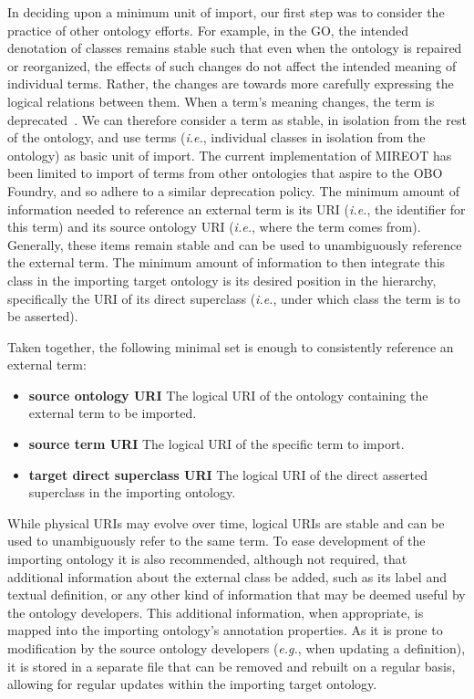 \documentclass[jou]{ao2e}%
\begin{document}
In deciding upon a minimum unit of import, our first step was to consider the practice of other ontology efforts.
For example, in the \ac{GO}, the intended denotation of classes remains stable such that even when the ontology is repaired or reorganized, the effects of such changes do not affect the intended meaning of individual terms.
Rather, the changes are towards more carefully expressing the logical relations between them.
When a term's meaning changes, the term is deprecated~\citep{GOGuide}.
We can therefore consider a term as stable, in isolation from the rest of the ontology, and use terms (\emph{i.e.}, individual classes in isolation from the ontology) as basic unit of import.
The current implementation of \ac{MIREOT} has been limited to import of terms from other ontologies that aspire to the OBO Foundry, and so adhere to a similar deprecation policy.
The minimum amount of information needed to reference an external term is its \ac{URI} (\textit {i.e.}, the identifier for this term) and its source ontology \ac{URI} (\textit {i.e.}, where the term comes from). 
Generally, these items remain stable and can be used to unambiguously reference the external term.
The minimum amount of information to then integrate this class in the importing target ontology is its desired position in the hierarchy, specifically the URI of its direct superclass (\textit {i.e.}, under which class the term is to be asserted).

Taken together, the following minimal set is enough to consistently reference an external term:
\begin{itemize}
 \item \textbf{source ontology \ac{URI}} The logical \ac{URI} of the ontology containing the external term to be imported. 
 \item \textbf{source term \ac{URI}} The logical \ac{URI} of the specific term to import. 
 \item \textbf{target direct superclass \ac{URI}} The logical \ac{URI} of the direct asserted superclass in the importing ontology.
\end{itemize} 

While physical URIs may evolve over time, logical URIs are stable and can be used to unambiguously refer to the same term.
To ease development of the importing ontology it is also recommended, although not required, that additional information about the external class be added, such as its label and textual definition, or any other kind of information that may be deemed useful by the ontology developers.
This additional information, when appropriate, is mapped into the importing ontology's annotation properties. As it is prone to modification by the source ontology developers (\textit{e.g.}, when updating a definition), it is stored in a separate file that can be removed and rebuilt on a regular basis, allowing for regular updates within the importing target ontology.
\end{document}
